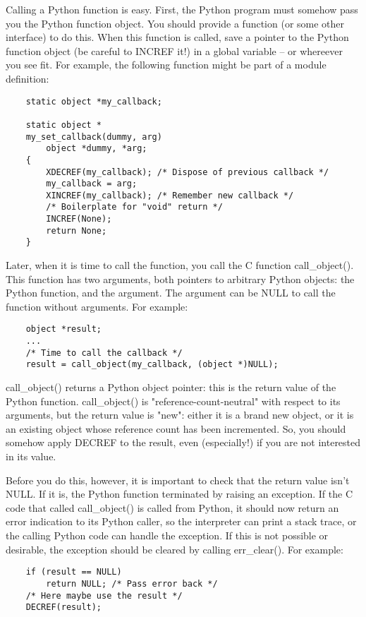 Calling a Python function is easy.  First, the Python program must
somehow pass you the Python function object.  You should provide a
function (or some other interface) to do this.  When this function is
called, save a pointer to the Python function object (be careful to
INCREF it!) in a global variable -- or whereever you see fit.
For example, the following function might be part of a module
definition:

\begin{verbatim}
    static object *my_callback;

    static object *
    my_set_callback(dummy, arg)
        object *dummy, *arg;
    {
        XDECREF(my_callback); /* Dispose of previous callback */
        my_callback = arg;
        XINCREF(my_callback); /* Remember new callback */
        /* Boilerplate for "void" return */
        INCREF(None);
        return None;
    }
\end{verbatim}

Later, when it is time to call the function, you call the C function
call_object().  This function has two arguments, both pointers to
arbitrary Python objects: the Python function, and the argument.  The
argument can be NULL to call the function without arguments.  For
example:

\begin{verbatim}
    object *result;
    ...
    /* Time to call the callback */
    result = call_object(my_callback, (object *)NULL);
\end{verbatim}

call_object() returns a Python object pointer: this is
the return value of the Python function.  call_object() is
"reference-count-neutral" with respect to its arguments, but the
return value is "new": either it is a brand new object, or it is an
existing object whose reference count has been incremented.  So, you
should somehow apply DECREF to the result, even (especially!) if you
are not interested in its value.

Before you do this, however, it is important to check that the return
value isn't NULL.  If it is, the Python function terminated by raising
an exception.  If the C code that called call_object() is called from
Python, it should now return an error indication to its Python caller,
so the interpreter can print a stack trace, or the calling Python code
can handle the exception.  If this is not possible or desirable, the
exception should be cleared by calling err_clear().  For example:

\begin{verbatim}
    if (result == NULL)
        return NULL; /* Pass error back */
    /* Here maybe use the result */
    DECREF(result); 
\end{verbatim}

